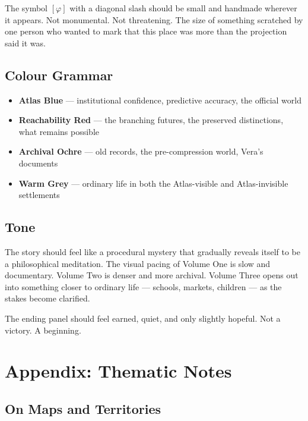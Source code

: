 \documentclass[11pt, letterpaper]{article}
\begin{document}
The symbol $[\varphi]$ with a diagonal slash should be small and handmade
wherever it appears. Not monumental. Not threatening. The size of something
scratched by one person who wanted to mark that this place was more than the
projection said it was.

\subsection*{Colour Grammar}

\begin{itemize}[leftmargin=1.5em, itemsep=0.2em]
  \item {\color{atlasblue}\textbf{Atlas Blue}} — institutional confidence,
    predictive accuracy, the official world
  \item {\color{reachred}\textbf{Reachability Red}} — the branching futures,
    the preserved distinctions, what remains possible
  \item \textbf{Archival Ochre} — old records, the pre-compression world,
    Vera's documents
  \item \textbf{Warm Grey} — ordinary life in both the Atlas-visible and
    Atlas-invisible settlements
\end{itemize}

\subsection*{Tone}

The story should feel like a procedural mystery that gradually reveals itself
to be a philosophical meditation. The visual pacing of Volume One is slow and
documentary. Volume Two is denser and more archival. Volume Three opens out
into something closer to ordinary life — schools, markets, children — as the
stakes become clarified.

The ending panel should feel earned, quiet, and only slightly hopeful. Not a
victory. A beginning.

\newpage


\section*{Appendix: Thematic Notes}

\subsection*{On Maps and Territories}
\end{document}
